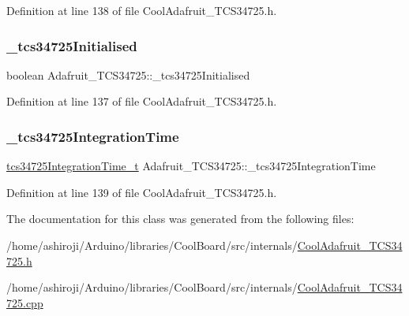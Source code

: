 Definition at line 138 of file Cool\+Adafruit\+\_\+\+T\+C\+S34725.\+h.

\mbox{\label{class_adafruit___t_c_s34725_ae9368bc77b501044f034d5d9ad3266ba}} 
\subsubsection{\texorpdfstring{\+\_\+tcs34725\+Initialised}{\_tcs34725Initialised}}
{\footnotesize\ttfamily boolean Adafruit\+\_\+\+T\+C\+S34725\+::\+\_\+tcs34725\+Initialised\hspace{0.3cm}{\ttfamily [private]}}



Definition at line 137 of file Cool\+Adafruit\+\_\+\+T\+C\+S34725.\+h.

\mbox{\label{class_adafruit___t_c_s34725_afbfddd381324226265955f436c82efd3}} 
\subsubsection{\texorpdfstring{\+\_\+tcs34725\+Integration\+Time}{\_tcs34725IntegrationTime}}
{\footnotesize\ttfamily \hyperlink{_cool_adafruit___t_c_s34725_8h_a09f4624f70b21f0ec2526dbaedb5895e}{tcs34725\+Integration\+Time\+\_\+t} Adafruit\+\_\+\+T\+C\+S34725\+::\+\_\+tcs34725\+Integration\+Time\hspace{0.3cm}{\ttfamily [private]}}



Definition at line 139 of file Cool\+Adafruit\+\_\+\+T\+C\+S34725.\+h.



The documentation for this class was generated from the following files\+:\begin{DoxyCompactItemize}
\item 
/home/ashiroji/\+Arduino/libraries/\+Cool\+Board/src/internals/\hyperlink{_cool_adafruit___t_c_s34725_8h}{Cool\+Adafruit\+\_\+\+T\+C\+S34725.\+h}\item 
/home/ashiroji/\+Arduino/libraries/\+Cool\+Board/src/internals/\hyperlink{_cool_adafruit___t_c_s34725_8cpp}{Cool\+Adafruit\+\_\+\+T\+C\+S34725.\+cpp}\end{DoxyCompactItemize}
